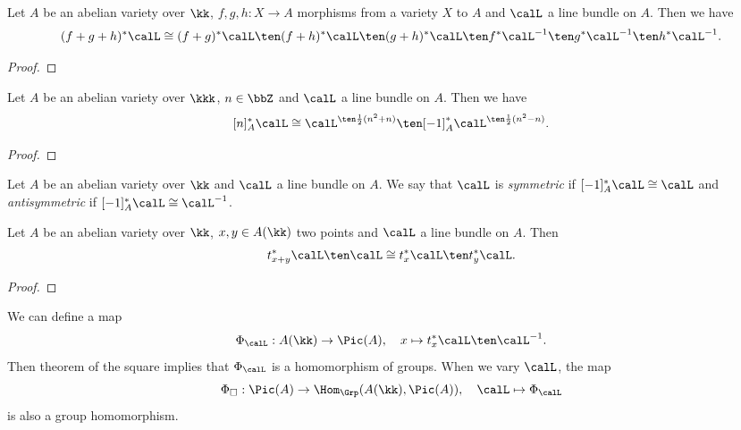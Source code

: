     \begin{proposition}
        Let \(A\) be an abelian variety over \(\kk\), \(f,g,h: X \to A\) morphisms from a variety \(X\) to \(A\) and \(\calL\) a line bundle on \(A\).
        Then we have
        \[ (f+g+h)^*\calL \cong (f+g)^*\calL \ten (f+h)^*\calL \ten (g+h)^*\calL \ten f^*\calL^{-1} \ten g^*\calL^{-1} \ten h^*\calL^{-1}. \]
    \end{proposition}
    \begin{proof}
    \end{proof}

    \begin{proposition}\label{prop: pull back of line bundles along the multiplication by n}
        Let \(A\) be an abelian variety over \(\kkk\), \(n\in \bbZ\) and \(\calL\) a line bundle on \(A\). 
        Then we have 
        \[ [n]_A^*\calL \cong \calL^{\ten \frac{1}{2}(n^2+n)} \ten [-1]_A^*\calL^{\ten \frac{1}{2}(n^2-n)}. \]
    \end{proposition}
    \begin{proof}
    \end{proof}

    \begin{definition}\label{def:symmetric_and_antisymmetric_line_bundles}
        Let \(A\) be an abelian variety over \(\kk\) and \(\calL\) a line bundle on \(A\).
        We say that \(\calL\) is \emph{symmetric} if \([-1]_A^*\calL \cong \calL\) and \emph{antisymmetric} if \([-1]_A^*\calL \cong \calL^{-1}\).
    \end{definition}

    \begin{theorem}\label{thm: theorem of the square}
        Let \(A\) be an abelian variety over \(\kk\), \(x,y \in A(\kk)\) two points and \(\calL\) a line bundle on \(A\).
        Then 
        \[ t_{x+y}^*\calL \ten \calL \cong t_x^*\calL \ten t_y^*\calL. \]
    \end{theorem}
    \begin{proof}
    \end{proof}

    \begin{remark}\label{rmk: theorem of the square and homomorphism to Picard group}
        We can define a map
        \[ \Phi_\calL: A(\kk) \to \Pic(A), \quad x \mapsto t_x^*\calL \ten \calL^{-1}. \]
        Then theorem of the square implies that \(\Phi_\calL\) is a homomorphism of groups.
        When we vary \(\calL\), the map 
        \[ \Phi_{\square}: \Pic(A) \to \Hom_{\Grp}(A(\kk), \Pic(A)), \quad \calL \mapsto \Phi_\calL \]
        is also a group homomorphism.
    \end{remark}

